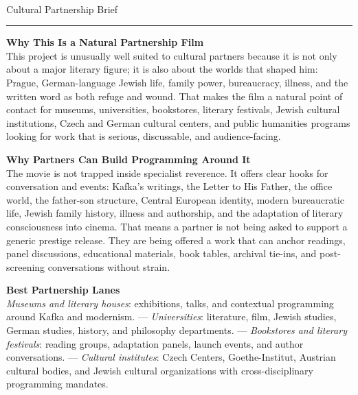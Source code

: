 \documentclass[11pt,letterpaper]{article}
\begin{document}
\begin{center}
{\Large\bfseries\sffamily \filmtitleupper}\\[3pt]
{\normalsize\sffamily\color{kafkagray} Cultural Partnership Brief}
\end{center}
\vspace{2pt}
\textcolor{sectionrule}{\rule{\textwidth}{0.5pt}}
\vspace{4pt}

\textbf{Why This Is a Natural Partnership Film}\\
This project is unusually well suited to cultural partners because it is not only about a major literary figure; it is also about the worlds that shaped him: Prague, German-language Jewish life, family power, bureaucracy, illness, and the written word as both refuge and wound. That makes the film a natural point of contact for museums, universities, bookstores, literary festivals, Jewish cultural institutions, Czech and German cultural centers, and public humanities programs looking for work that is serious, discussable, and audience-facing.

\vspace{2pt}

\textbf{Why Partners Can Build Programming Around It}\\
The movie is not trapped inside specialist reverence. It offers clear hooks for conversation and events: Kafka's writings, the Letter to His Father, the office world, the father-son structure, Central European identity, modern bureaucratic life, Jewish family history, illness and authorship, and the adaptation of literary consciousness into cinema. That means a partner is not being asked to support a generic prestige release. They are being offered a work that can anchor readings, panel discussions, educational materials, book tables, archival tie-ins, and post-screening conversations without strain.

\vspace{2pt}

\textbf{Best Partnership Lanes}\\
\textit{Museums and literary houses}: exhibitions, talks, and contextual programming around Kafka and modernism. --- \textit{Universities}: literature, film, Jewish studies, German studies, history, and philosophy departments. --- \textit{Bookstores and literary festivals}: reading groups, adaptation panels, launch events, and author conversations. --- \textit{Cultural institutes}: Czech Centers, Goethe-Institut, Austrian cultural bodies, and Jewish cultural organizations with cross-disciplinary programming mandates.
\end{document}
